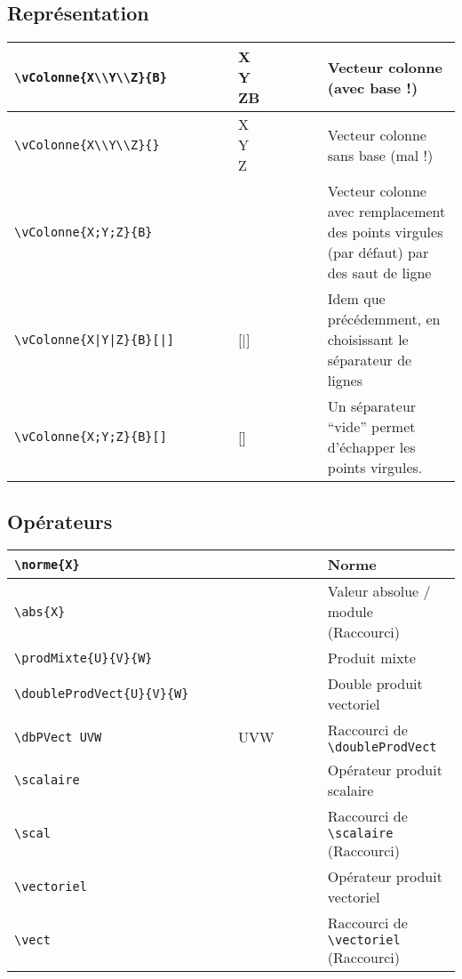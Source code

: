 \documentclass[a4paper,10pt]{article}
\newcommand{\rac}{({\color{red}Raccourci})}
\begin{document}
	\subsection{Représentation}
	\noindent
	\begin{tabular}{|p{0.5\linewidth}|p{0.2\linewidth}|p{0.3\linewidth}|}
		\hline
			\verb!\vColonne{X\\Y\\Z}{B}!	&	\vColonne{X\\Y\\Z}{B}		&	Vecteur colonne (avec base !)
		\\\hline
			\verb!\vColonne{X\\Y\\Z}{}!	&	\vColonne{X\\Y\\Z}{}		&	Vecteur colonne sans base (mal !)
		\\\hline
			\verb!\vColonne{X;Y;Z}{B}!	&	\vColonne{X;Y;Z}{B}		&	Vecteur colonne avec remplacement des points virgules (par défaut) par des saut de ligne
		\\\hline
			\verb!\vColonne{X|Y|Z}{B}[|]!	&	\vColonne{X|Y|Z}{B}[|]		&	Idem que précédemment, en choisissant le séparateur de lignes
		\\\hline
			\verb!\vColonne{X;Y;Z}{B}[]!	&	\vColonne{X;Y;Z}{B}[]		&	Un séparateur ``vide'' permet d'échapper les points virgules.
		\\\hline
	\end{tabular}

	\subsection{Opérateurs}
	\noindent
	\begin{tabular}{|p{0.5\linewidth}|p{0.2\linewidth}|p{0.3\linewidth}|}
		\hline
			\verb!\norme{X}!	&	\norme{X}	&	Norme
		\\\hline
			\verb!\abs{X}!		&	\abs{X}		&	Valeur absolue / module \rac
		\\\hline
			\verb!\prodMixte{U}{V}{W}!	&	\prodMixte{U}{V}{W}		&	Produit mixte
		\\\hline
			\verb!\doubleProdVect{U}{V}{W}!		&	\doubleProdVect{U}{V}{W}	&	Double produit vectoriel
		\\\hline
			\verb!\dbPVect UVW!		&	\dbPVect UVW	&	Raccourci de \verb!\doubleProdVect!
		\\\hline
			\verb!\scalaire!			&	\scalaire		&	Opérateur produit scalaire
		\\\hline
			\verb!\scal!				&	\scal			&	Raccourci de \verb!\scalaire! \rac
		\\\hline
			\verb!\vectoriel!			&	\vectoriel		&	Opérateur produit vectoriel
		\\\hline
			\verb!\vect!				&	\vect			&	Raccourci de \verb!\vectoriel! \rac
		\\\hline
	\end{tabular}
\end{document}
